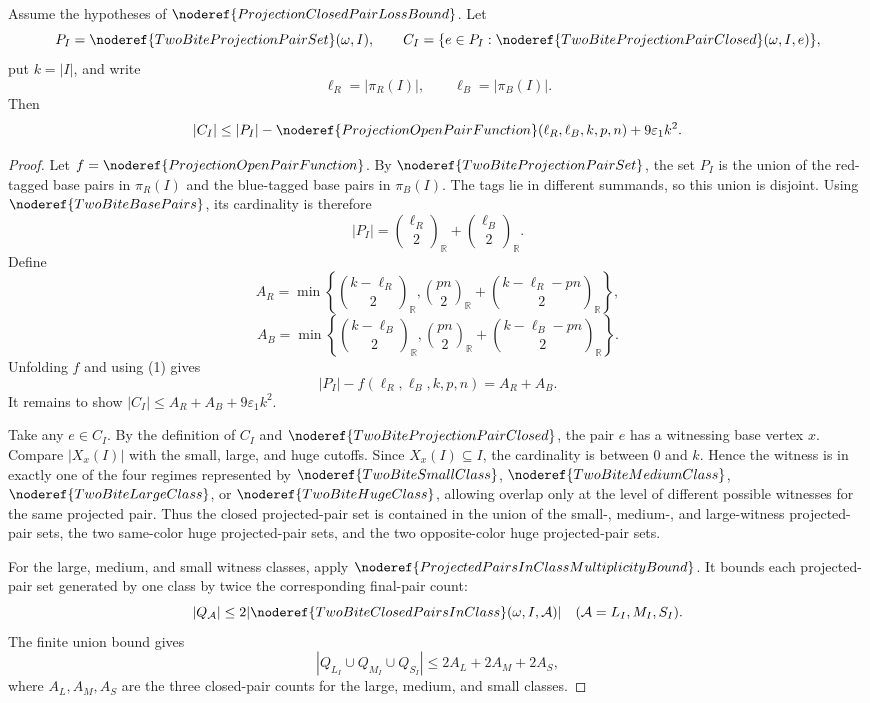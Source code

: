 \begin{helper}
Assume the hypotheses of \(\noderef{ProjectionClosedPairLossBound}\).  Let
\[
P_I=\noderef{TwoBiteProjectionPairSet}(\omega,I),\qquad
C_I=\{e\in P_I:\noderef{TwoBiteProjectionPairClosed}(\omega,I,e)\},
\]
put \(k=|I|\), and write
\[
\ell_R=|\pi_R(I)|,\qquad \ell_B=|\pi_B(I)|.
\]
Then
\[
|C_I|
\le
|P_I|-
\noderef{ProjectionOpenPairFunction}(\ell_R,\ell_B,k,p,n)
+9\varepsilon_1 k^2 .
\]
\end{helper}
\begin{proof}
Let \(f=\noderef{ProjectionOpenPairFunction}\).  By
\(\noderef{TwoBiteProjectionPairSet}\), the set \(P_I\) is the union of the
red-tagged base pairs in \(\pi_R(I)\) and the blue-tagged base pairs in
\(\pi_B(I)\).  The tags lie in different summands, so this union is disjoint.
Using \(\noderef{TwoBiteBasePairs}\), its cardinality is therefore
\[
|P_I|=\binom{\ell_R}{2}_{\mathbb R}
     +\binom{\ell_B}{2}_{\mathbb R}. \tag{1}
\]
Define
\[
A_R=
\min\left\{\binom{k-\ell_R}{2}_{\mathbb R},
  \binom{pn}{2}_{\mathbb R}+\binom{k-\ell_R-pn}{2}_{\mathbb R}\right\},
\]
\[
A_B=
\min\left\{\binom{k-\ell_B}{2}_{\mathbb R},
  \binom{pn}{2}_{\mathbb R}+\binom{k-\ell_B-pn}{2}_{\mathbb R}\right\}.
\]
Unfolding \(f\) and using (1) gives
\[
|P_I|-f(\ell_R,\ell_B,k,p,n)=A_R+A_B. \tag{2}
\]
It remains to show \(|C_I|\le A_R+A_B+9\varepsilon_1 k^2\).

Take any \(e\in C_I\).  By the definition of \(C_I\) and
\(\noderef{TwoBiteProjectionPairClosed}\), the pair \(e\) has a witnessing
base vertex \(x\).  Compare \(|X_x(I)|\) with the small, large, and huge
cutoffs.  Since \(X_x(I)\subseteq I\), the cardinality is between \(0\) and
\(k\).  Hence the witness is in exactly one of the four regimes represented
by \(\noderef{TwoBiteSmallClass}\), \(\noderef{TwoBiteMediumClass}\),
\(\noderef{TwoBiteLargeClass}\), or \(\noderef{TwoBiteHugeClass}\), allowing
overlap only at the level of different possible witnesses for the same
projected pair.  Thus the closed projected-pair set is contained in the union
of the small-, medium-, and large-witness projected-pair sets, the two
same-color huge projected-pair sets, and the two opposite-color huge
projected-pair sets.

For the large, medium, and small witness classes, apply
\(\noderef{ProjectedPairsInClassMultiplicityBound}\).  It bounds each
projected-pair set generated by one class by twice the corresponding
final-pair count:
\[
|Q_{\mathcal A}|
\le 2|\noderef{TwoBiteClosedPairsInClass}(\omega,I,\mathcal A)|
\quad
(\mathcal A=L_I,M_I,S_I).
\]
The finite union bound gives
\[
|Q_{L_I}\cup Q_{M_I}\cup Q_{S_I}|
\le 2A_L+2A_M+2A_S,
\]
where \(A_L,A_M,A_S\) are the three closed-pair counts for the large,
medium, and small classes.


\end{proof}
